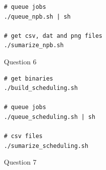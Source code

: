 \documentclass[12pt]{article}
\begin{document}
\begin{figure}[h!]
	\begin{verbatim}
# queue jobs
./queue_npb.sh | sh

# get csv, dat and png files
./sumarize_npb.sh
	\end{verbatim}
\caption{Question 6}\label{code:q6}
\end{figure}

\begin{figure}[h!]
	\begin{verbatim}
# get binaries
./build_scheduling.sh

# queue jobs
./queue_scheduling.sh | sh

# csv files
./sumarize_scheduling.sh
	\end{verbatim}
	\caption{Question 7}\label{code:q7}
\end{figure}
\end{document}
